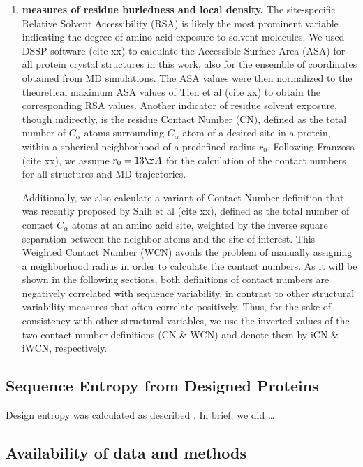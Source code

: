 \documentclass[12pt]{article}
\begin{document}
\begin{enumerate}
            \item {\bf measures of residue buriedness and local density.}
                The site-specific Relative Solvent Accessibility (RSA) is likely the most prominent variable indicating the degree of amino acid exposure to solvent molecules. We used DSSP software (cite xx) to calculate the Accessible Surface Area (ASA) for all protein crystal structures in this work, also for the ensemble of coordinates obtained from MD simulations. The ASA values were then normalized to the theoretical maximum ASA values of Tien et al (cite xx) to obtain the corresponding RSA values. Another indicator of residue solvent exposure, though indirectly, is the residue Contact Number (CN), defined as the total number of $C_\alpha$ atoms surrounding $C_\alpha$ atom of a desired site in a protein, within a spherical neighborhood of a predefined radius $r_0$. Following Franzosa (cite xx), we assume $r_0=13\AA$ for the calculation of the contact numbers for all structures and MD trajectories.

                Additionally, we also calculate a variant of Contact Number definition that was recently proposed by Shih et al (cite xx), defined as the total number of contact $C_\alpha$ atoms at an amino acid site, weighted by the inverse square separation between the neighbor atoms and the site of interest. This Weighted Contact Number (WCN) avoids the problem of manually assigning a neighborhood radius in order to calculate the contact numbers. As it will be shown in the following sections, both definitions of contact numbers are negatively correlated with sequence variability, in contrast to other structural variability measures that often correlate positively. Thus, for the sake of consistency with other structural variables, we use the inverted values of the two contact number definitions (CN \& WCN) and denote them by iCN \& iWCN, respectively.

        \end{enumerate}

\subsection*{Sequence Entropy from Designed Proteins}

Design entropy was calculated as described \citep{Jacksonetal2013}. In brief, we did \dots

\subsection*{Availability of data and methods}
\end{document}
